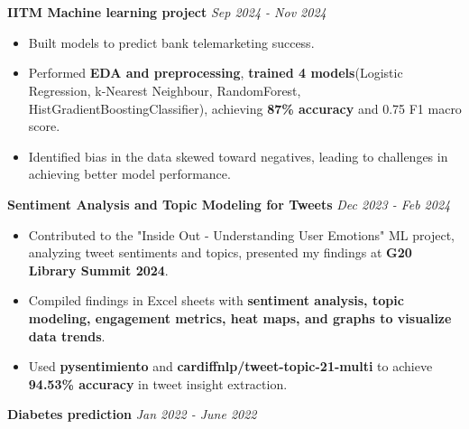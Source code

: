 \documentclass[a4paper,10pt]{article}
\begin{document}
\section{\scshape\color{Fuchsia}{\faLaptopCode\ \textbf PROJECTS}}
\textbf{IITM Machine learning project} \href{https://github.com/ShreehariA/IITM_MLP_Project}{} \hfill \textit{Sep 2024 - Nov 2024}
\vspace{-2mm}
\begin{itemize}
    \item Built models to predict bank telemarketing success.
    \vspace{-2mm}
    \item Performed \textbf{EDA and preprocessing}, \textbf{trained 4 models}(Logistic Regression, k-Nearest Neighbour, RandomForest, HistGradientBoostingClassifier), achieving \textbf{87\% accuracy} and 0.75 F1 macro score.
    \vspace{-2mm}
    \item Identified bias in the data skewed toward negatives, leading to challenges in achieving better model performance.
\end{itemize}
\textbf{Sentiment Analysis and Topic Modeling for Tweets} \href{https://github.com/ShreehariA/G20_Library_Summit}{} \hfill \textit{Dec 2023 - Feb 2024}
\vspace{-2mm}
\begin{itemize}
    \item Contributed to the "Inside Out - Understanding User Emotions" ML project, analyzing tweet sentiments and topics, presented my findings at \textbf{G20 Library Summit 2024}.
    \vspace{-2mm}
    \item Compiled findings in Excel sheets with \textbf{sentiment analysis, topic modeling, engagement metrics, heat maps, and graphs to visualize data trends}.
    \vspace{-2mm}
    \item Used \textbf{pysentimiento} and \textbf{cardiffnlp/tweet-topic-21-multi} to achieve \textbf{94.53\% accuracy} in tweet insight extraction.
\end{itemize}
\textbf{Diabetes prediction} \href{https://github.com/ShreehariA/diabetes-pred}{} \hfill \textit{Jan 2022 - June 2022}
\vspace{-2mm}
\end{document}
